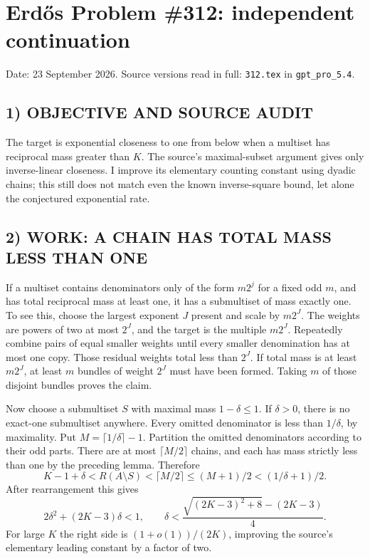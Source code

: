 \section{Erd\H{o}s Problem \#312: independent continuation}
\noindent Date: 23 September 2026. Source versions read in full: \texttt{312.tex} in \texttt{gpt\_pro\_5.4}.

\subsection*{1) OBJECTIVE AND SOURCE AUDIT}
The target is exponential closeness to one from below when a multiset has
reciprocal mass greater than $K$. The source's maximal-subset argument gives
only inverse-linear closeness. I improve its elementary counting constant
using dyadic chains; this still does not match even the known inverse-square
bound, let alone the conjectured exponential rate.

\subsection*{2) WORK: A CHAIN HAS TOTAL MASS LESS THAN ONE}
If a multiset contains denominators only of the form $m2^j$ for a fixed odd
$m$, and has total reciprocal mass at least one, it has a submultiset of
mass exactly one. To see this, choose the largest exponent $J$ present
and scale by $m2^J$. The weights are powers of two at most $2^J$, and
the target is the multiple $m2^J$. Repeatedly combine pairs of equal
smaller weights until every smaller denomination has at most one copy.
Those residual weights total less than $2^J$. If total mass is at least
$m2^J$, at least $m$ bundles of weight $2^J$ must have been formed.
Taking $m$ of those disjoint bundles proves the claim.

Now choose a submultiset $S$ with maximal mass $1-\delta\le1$. If
$\delta>0$, there is no exact-one submultiset anywhere. Every omitted
denominator is less than $1/\delta$, by maximality. Put
$M=\lceil1/\delta\rceil-1$. Partition the omitted denominators according
to their odd parts. There are at most $\lceil M/2\rceil$ chains, and
each has mass strictly less than one by the preceding lemma. Therefore
\[
 K-1+\delta<R(A\setminus S)<\lceil M/2\rceil
 \le(M+1)/2<(1/\delta+1)/2.
\]
After rearrangement this gives
\[
 2\delta^2+(2K-3)\delta<1,
\qquad
 \delta<\frac{\sqrt{(2K-3)^2+8}-(2K-3)}4.
\]
For large $K$ the right side is $(1+o(1))/(2K)$, improving the source's
elementary leading constant by a factor of two.

